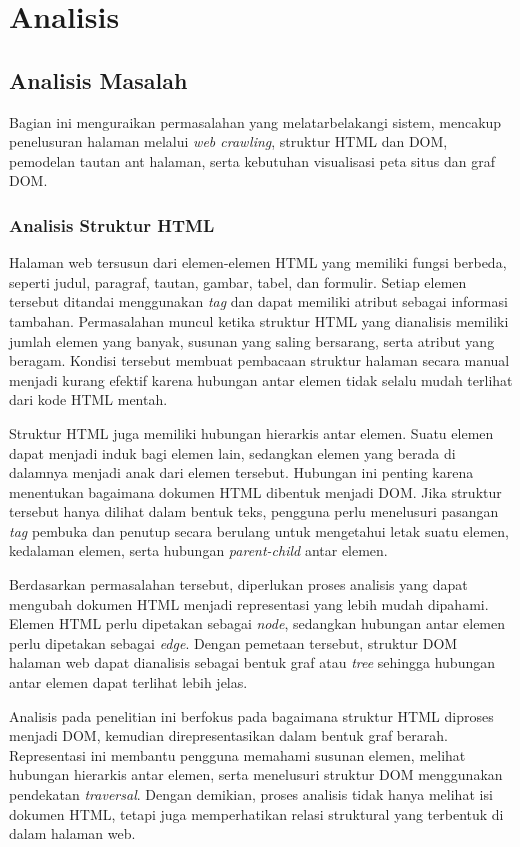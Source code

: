 \chapter{Analisis}
\label{chap:analisis}

\section{Analisis Masalah}
\label{sec:analisis-masalah}
Bagian ini menguraikan permasalahan yang melatarbelakangi sistem, mencakup penelusuran halaman melalui \textit{web crawling}, struktur HTML dan DOM, pemodelan tautan ant halaman, serta kebutuhan visualisasi peta situs dan graf DOM.

\subsection{Analisis Struktur HTML}
Halaman web tersusun dari elemen-elemen HTML yang memiliki fungsi berbeda, seperti judul, paragraf, tautan, gambar, tabel, dan formulir. Setiap elemen tersebut ditandai menggunakan \textit{tag} dan dapat memiliki atribut sebagai informasi tambahan. Permasalahan muncul ketika struktur HTML yang dianalisis memiliki jumlah elemen yang banyak, susunan yang saling bersarang, serta atribut yang beragam. Kondisi tersebut membuat pembacaan struktur halaman secara manual menjadi kurang efektif karena hubungan antar elemen tidak selalu mudah terlihat dari kode HTML mentah.

Struktur HTML juga memiliki hubungan hierarkis antar elemen. Suatu elemen dapat menjadi induk bagi elemen lain, sedangkan elemen yang berada di dalamnya menjadi anak dari elemen tersebut. Hubungan ini penting karena menentukan bagaimana dokumen HTML dibentuk menjadi DOM. Jika struktur tersebut hanya dilihat dalam bentuk teks, pengguna perlu menelusuri pasangan \textit{tag} pembuka dan penutup secara berulang untuk mengetahui letak suatu elemen, kedalaman elemen, serta hubungan \textit{parent-child} antar elemen.

Berdasarkan permasalahan tersebut, diperlukan proses analisis yang dapat mengubah dokumen HTML menjadi representasi yang lebih mudah dipahami. Elemen HTML perlu dipetakan sebagai \textit{node}, sedangkan hubungan antar elemen perlu dipetakan sebagai \textit{edge}. Dengan pemetaan tersebut, struktur DOM halaman web dapat dianalisis sebagai bentuk graf atau \textit{tree} sehingga hubungan antar elemen dapat terlihat lebih jelas.

Analisis pada penelitian ini berfokus pada bagaimana struktur HTML diproses menjadi DOM, kemudian direpresentasikan dalam bentuk graf berarah. Representasi ini membantu pengguna memahami susunan elemen, melihat hubungan hierarkis antar elemen, serta menelusuri struktur DOM menggunakan pendekatan \textit{traversal}. Dengan demikian, proses analisis tidak hanya melihat isi dokumen HTML, tetapi juga memperhatikan relasi struktural yang terbentuk di dalam halaman web.

